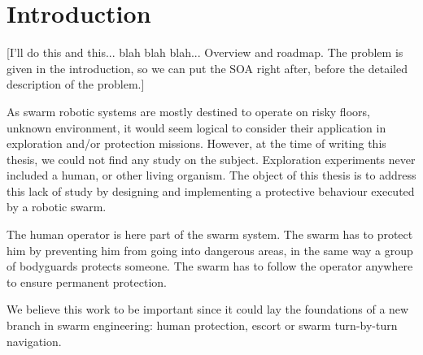 \documentclass[oneside, a4paper, 12pt]{memoir}
\begin{document}
\chapter{Introduction}

[I'll do this and this... blah blah blah... Overview and roadmap. The problem is given in the introduction, so we can put the SOA right after, before the detailed description of the problem.]

As swarm robotic systems are mostly destined to operate on risky floors, unknown environment, it would seem logical to consider their application in exploration and/or protection missions. However, at the time of writing this thesis, we could not find any study on the subject. Exploration experiments never included a human, or other living organism. The object of this thesis is to address this lack of study by designing and implementing a protective behaviour executed by a robotic swarm.
	
	The human operator is here part of the swarm system. The swarm has to protect him by preventing him from going into dangerous areas, in the same way a group of bodyguards protects someone. The swarm has to follow the operator anywhere to ensure permanent protection.
	
	We believe this work to be important since it could lay the foundations of a new branch in swarm engineering: human protection, escort or swarm turn-by-turn navigation.
	
\end{document}
